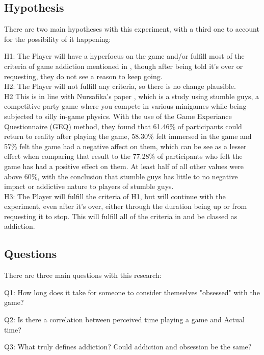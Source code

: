 \documentclass[conference]{IEEEtran}
\begin{document}
\subsection{Hypothesis}
There are two main hypotheses with this experiment, with a third one to account for the possibility of it happening:

H1: The Player will have a hyperfocus on the game and/or fulfill most of the criteria of game addiction mentioned in \cite{NHSHamp24}, though after being told it's over or requesting, they do not see a reason to keep going.\\


H2: The Player will not fulfill any criteria, so there is no change plausible.\\

H2 This is in line with Nursafika's paper \cite{Nursafika2024}, which is a study using stumble guys, a competitive party game where you compete in various minigames while being subjected to silly in-game physics. With the use of the Game Experiance Questionnaire (GEQ) method, they found that 61.46\% of participants could return to reality after playing the game, 58.30\% felt immersed in the game and 57\% felt the game had a negative affect on them, which can be see as a lesser effect when comparing that result to the 77.28\% of participants who felt the game has had a positive effect on them. At least half of all other values were above 60\%,  with the conclusion that stumble guys has little to no negative impact or addictive nature to players of stumble guys.\\

H3: The Player will fulfill the criteria of H1, but will continue with the experiment, even after it's over, either through the duration being up or from requesting it to stop. This will fulfill all of the criteria in \cite{NHSHamp24} and be classed as addiction. \\

\subsection{Questions}
There are three main questions with this research:

Q1: How long does it take for someone to consider themselves "obsessed" with the game?

Q2: Is there a correlation between perceived time playing a game and Actual time?

Q3: What truly defines addiction? Could addiction and obsession be the same?\\
\end{document}
